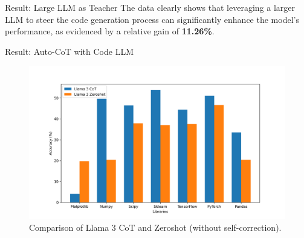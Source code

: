 \begin{frame}{Result: Large LLM as Teacher}
    The data clearly shows that leveraging a larger LLM to steer the code generation process can significantly enhance the model's performance, as evidenced by a relative gain of \textbf{11.26\%}.

    \begin{table}[H]
        \caption*{$\text{Pass@5}$ results on the DS-1000 dataset with different LLM stacks. (\%)}
        \centering
    \end{table}
\end{frame}

\begin{frame}{Result: Auto-CoT with Code LLM}
    \begin{figure}[H]
        \centering
        \includegraphics[width=\columnwidth]{img/code_llm}
        \caption*{Comparison of Llama 3 CoT and Zeroshot (without self-correction).}
    \end{figure}
\end{frame}
